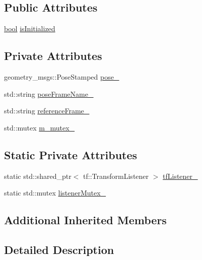 \subsection*{Public Attributes}
\begin{DoxyCompactItemize}
\item 
\hyperlink{classbool}{bool} \hyperlink{classcl__move__base__z_1_1Pose_a49df3a978021edb71a48ef5e6d8e75a8}{is\+Initialized}
\end{DoxyCompactItemize}
\subsection*{Private Attributes}
\begin{DoxyCompactItemize}
\item 
geometry\+\_\+msgs\+::\+Pose\+Stamped \hyperlink{classcl__move__base__z_1_1Pose_a9da7acf880968a3c220b8436fd0bb6ef}{pose\+\_\+}
\item 
std\+::string \hyperlink{classcl__move__base__z_1_1Pose_a4f45be8e2fd73e618d815582a4ca8efe}{pose\+Frame\+Name\+\_\+}
\item 
std\+::string \hyperlink{classcl__move__base__z_1_1Pose_a6a7a593232b6edaf99103d48ad8da9d3}{reference\+Frame\+\_\+}
\item 
std\+::mutex \hyperlink{classcl__move__base__z_1_1Pose_a73ed2daba3e473e156cab751fb37b58f}{m\+\_\+mutex\+\_\+}
\end{DoxyCompactItemize}
\subsection*{Static Private Attributes}
\begin{DoxyCompactItemize}
\item 
static std\+::shared\+\_\+ptr$<$ tf\+::\+Transform\+Listener $>$ \hyperlink{classcl__move__base__z_1_1Pose_a188a5ac62d5424c1eacd667868049962}{tf\+Listener\+\_\+}
\item 
static std\+::mutex \hyperlink{classcl__move__base__z_1_1Pose_ae1b5ee53f49d74926e04a477d792f1d0}{listener\+Mutex\+\_\+}
\end{DoxyCompactItemize}
\subsection*{Additional Inherited Members}


\subsection{Detailed Description}


